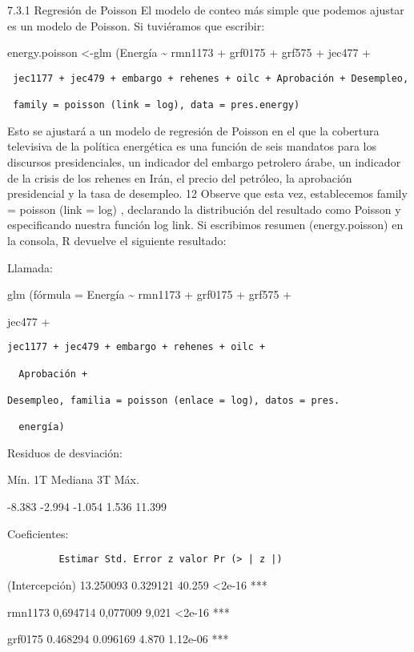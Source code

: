 \documentclass[
]{book}
\begin{document}
7.3.1 Regresión de Poisson
El modelo de conteo más simple que podemos ajustar es un modelo de Poisson. Si tuviéramos que escribir:

energy.poisson \textless-glm (Energía \textasciitilde{} rmn1173 + grf0175 + grf575 + jec477 +

\begin{verbatim}
 jec1177 + jec479 + embargo + rehenes + oilc + Aprobación + Desempleo,

 family = poisson (link = log), data = pres.energy)
\end{verbatim}

Esto se ajustará a un modelo de regresión de Poisson en el que la cobertura televisiva de la política energética es una función de seis mandatos para los discursos presidenciales, un indicador del embargo petrolero árabe, un indicador de la crisis de los rehenes en Irán, el precio del petróleo, la aprobación presidencial y la tasa de desempleo. 12 Observe que esta vez, establecemos family = poisson (link = log) , declarando la distribución del resultado como Poisson y especificando nuestra función log link. Si escribimos resumen (energy.poisson) en la consola, R devuelve el siguiente resultado:

Llamada:

glm (fórmula = Energía \textasciitilde{} rmn1173 + grf0175 + grf575 +

jec477 +

\begin{verbatim}
jec1177 + jec479 + embargo + rehenes + oilc +

  Aprobación +

Desempleo, familia = poisson (enlace = log), datos = pres.

  energía)
\end{verbatim}

Residuos de desviación:

Mín. 1T Mediana 3T Máx.

-8.383 -2.994 -1.054 1.536 11.399

Coeficientes:

\begin{verbatim}
         Estimar Std. Error z valor Pr (> | z |)
\end{verbatim}

(Intercepción) 13.250093 0.329121 40.259 \textless2e-16 ***

rmn1173 0,694714 0,077009 9,021 \textless2e-16 ***

grf0175 0.468294 0.096169 4.870 1.12e-06 ***
\end{document}
